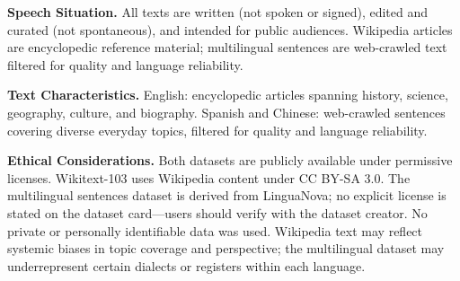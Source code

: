 \documentclass[11pt]{article}
\begin{document}
\textbf{Speech Situation.}
All texts are written (not spoken or signed), edited and curated (not spontaneous), and intended for public audiences. Wikipedia articles are encyclopedic reference material; multilingual sentences are web-crawled text filtered for quality and language reliability.

\textbf{Text Characteristics.}
English: encyclopedic articles spanning history, science, geography, culture, and biography. Spanish and Chinese: web-crawled sentences covering diverse everyday topics, filtered for quality and language reliability.

\textbf{Ethical Considerations.}
Both datasets are publicly available under permissive licenses. Wikitext-103 uses Wikipedia content under CC BY-SA 3.0. The multilingual sentences dataset is derived from LinguaNova; no explicit license is stated on the dataset card---users should verify with the dataset creator. No private or personally identifiable data was used. Wikipedia text may reflect systemic biases in topic coverage and perspective; the multilingual dataset may underrepresent certain dialects or registers within each language.
\end{document}
